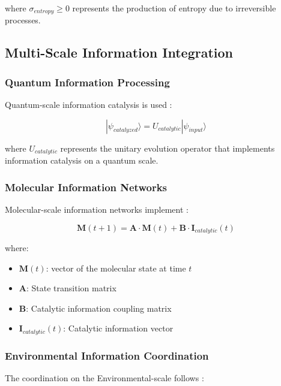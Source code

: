 \documentclass[12pt,a4paper]{article}
\begin{document}
where $\sigma_{entropy} \geq 0$ represents the production of entropy due to irreversible processes.

\subsection{Multi-Scale Information Integration}

\subsubsection{Quantum Information Processing}

Quantum-scale information catalysis is used \cite{nielsen2010quantum}:

\begin{equation}
|\psi_{catalyzed}\rangle = U_{catalytic} |\psi_{input}\rangle
\end{equation}

where $U_{catalytic}$ represents the unitary evolution operator that implements information catalysis on a quantum scale.

\subsubsection{Molecular Information Networks}

Molecular-scale information networks implement \cite{erdi2005mathematical}:

\begin{equation}
\mathbf{M}(t+1) = \mathbf{A} \cdot \mathbf{M}(t) + \mathbf{B} \cdot \mathbf{I}_{catalytic}(t)
\end{equation}

where:
\begin{itemize}
\item $\mathbf{M}(t)$: vector of the molecular state at time $t$
\item $\mathbf{A}$: State transition matrix
\item $\mathbf{B}$: Catalytic information coupling matrix
\item $\mathbf{I}_{catalytic}(t)$: Catalytic information vector
\end{itemize}

\subsubsection{Environmental Information Coordination}

The coordination on the Environmental-scale follows \cite{jackson1998classical}:
\end{document}
